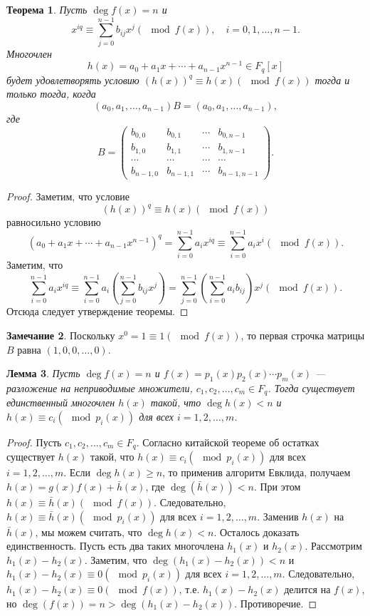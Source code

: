 \documentclass[12pt, titlepage, oneside]{amsbook}
\newtheorem{theorem}{Теорема}[chapter]
\newtheorem{lemma}[theorem]{Лемма}
\theoremstyle{definition}
\newtheorem{remark}[theorem]{Замечание}
\theoremstyle{remark}
\begin{document}
\begin{theorem}
	\label{Ber2}
	Пусть $\deg f(x)=n$ и $$x^{iq}\equiv\sum\limits_{j=0}^{n-1}b_{ij}x^j(\mod f(x)),\quad i=0,1,\ldots,n-1.$$ Многочлен $$h(x)=a_0+a_1x+\cdots+a_{n-1}x^{n-1}\in F_q[x]$$ будет удовлетворять условию $(h(x))^q\equiv h(x) (\mod f(x))$ тогда и только тогда, когда $$(a_0,a_1,\ldots,a_{n-1})B=(a_0,a_1,\ldots,a_{n-1}),$$ где $$B=\begin{pmatrix} b_{0,0}   & b_{0,1}   & \cdots & b_{0,n-1}   \\
                b_{1,0}   & b_{1,1}   & \cdots & b_{1,n-1}   \\
                \cdots    & \cdots    & \cdots & \cdots      \\
                b_{n-1,0} & b_{n-1,1} & \cdots & b_{n-1,n-1}\end{pmatrix}.$$
\end{theorem}

\begin{proof}
	Заметим, что условие $$(h(x))^q\equiv h(x) (\mod f(x))$$ равносильно условию $$(a_0+a_1x+\cdots+a_{n-1}x^{n-1})^q=\sum_{i=0}^{n-1}a_ix^{iq}\equiv\sum_{i=0}^{n-1}a_ix^{i}(\mod f(x)).$$ Заметим, что  $$\sum_{i=0}^{n-1}a_ix^{iq}\equiv\sum_{i=0}^{n-1}a_i\left(\sum\limits_{j=0}^{n-1}b_{ij}x^j\right)=\sum\limits_{j=0}^{n-1}\left(\sum_{i=0}^{n-1}a_ib_{ij}\right)x^j(\mod f(x)).$$ Отсюда следует утверждение теоремы.
\end{proof}

\begin{remark}
	Поскольку $x^0=1\equiv 1 (\mod f(x))$, то первая строчка матрицы $B$ равна $(1,0,0,\ldots,0)$.
\end{remark}

\begin{lemma}
	\label{Ber3}
	Пусть $\deg f(x)=n$ и $f(x)=p_1(x)p_2(x)\cdots p_m(x)$ --- разложение на неприводимые множители, $c_1,c_2,\ldots,c_m\in F_q$. Тогда существует единственный многочлен $h(x)$ такой, что $\deg h(x)<n$ и $h(x)\equiv c_i(\mod p_i(x))$ для всех $i=1,2,\ldots,m$.
\end{lemma}

\begin{proof}
	Пусть $c_1,c_2,\ldots,c_m\in F_q$. Согласно китайской теореме об остатках существует $h(x)$ такой, что $h(x)\equiv c_i(\mod p_i(x))$ для всех $i=1,2,\ldots,m$. Если $\deg h(x)\geq n$, то применив алгоритм Евклида, получаем $h(x)=g(x)f(x)+\bar{h}(x)$, где $\deg(\bar{h}(x))<n$. При этом $h(x)\equiv\bar{h}(x)(\mod f(x))$. Следовательно, $h(x)\equiv\bar{h}(x)(\mod p_i(x))$ для всех $i=1,2,\ldots,m$. Заменив $h(x)$ на $\bar{h}(x)$, мы можем считать, что $\deg h(x)<n$. Осталось доказать единственность. Пусть есть два таких многочлена $h_1(x)$ и $h_2(x)$. Рассмотрим $h_1(x)-h_2(x)$. Заметим, что $\deg (h_1(x)-h_2(x))<n$ и $h_1(x)-h_2(x)\equiv 0(\mod p_i(x))$ для всех $i=1,2,\ldots,m$. Следовательно, $h_1(x)-h_2(x)\equiv 0(\mod f(x))$, т.е. $h_1(x)-h_2(x)$ делится на $f(x)$, но $\deg(f(x))=n>\deg (h_1(x)-h_2(x))$. Противоречие.
\end{proof}
\end{document}
